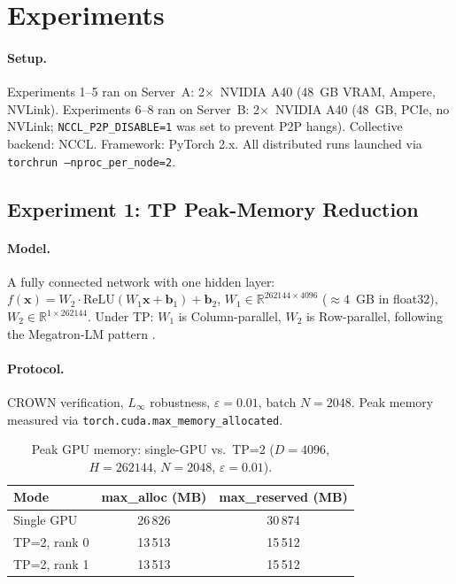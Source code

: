 \documentclass[11pt]{article}
\begin{document}
\section{Experiments}
\label{sec:experiments}

\paragraph{Setup.}
Experiments 1--5 ran on Server~A: 2$\times$~NVIDIA A40 (48~GB VRAM, Ampere,
NVLink). Experiments 6--8 ran on Server~B: 2$\times$~NVIDIA A40 (48~GB,
PCIe, no NVLink; \texttt{NCCL\_P2P\_DISABLE=1} was set to prevent P2P hangs).
Collective backend: NCCL. Framework: PyTorch 2.x.
All distributed runs launched via \texttt{torchrun --nproc\_per\_node=2}.

\subsection{Experiment 1: TP Peak-Memory Reduction}
\label{sec:exp1}

\paragraph{Model.}
A fully connected network with one hidden layer:
$f(\mathbf{x}) = W_2 \cdot \mathrm{ReLU}(W_1\mathbf{x} + \mathbf{b}_1) + \mathbf{b}_2$,
$W_1 \in \mathbb{R}^{262144 \times 4096}$ (${\approx}4$~GB in float32),
$W_2 \in \mathbb{R}^{1 \times 262144}$.
Under TP: $W_1$ is Column-parallel, $W_2$ is Row-parallel, following the
Megatron-LM pattern \citep{MegatronLM2020}.

\paragraph{Protocol.}
CROWN verification, $L_\infty$ robustness, $\varepsilon{=}0.01$, batch
$N{=}2048$. Peak memory measured via
\texttt{torch.cuda.max\_memory\_allocated}.

\begin{table}[h]
\caption{Peak GPU memory: single-GPU vs.\ TP=2
($D{=}4096$, $H{=}262144$, $N{=}2048$, $\varepsilon{=}0.01$).}
\label{tab:tp-memory}
\vskip 0.1in
\begin{center}
\begin{tabular}{lcc}
\toprule
Mode & max\_alloc (MB) & max\_reserved (MB) \\
\midrule
Single GPU    & 26\,826 & 30\,874 \\
TP=2, rank 0  & 13\,513 & 15\,512 \\
TP=2, rank 1  & 13\,513 & 15\,512 \\
\bottomrule
\end{tabular}
\end{center}
\end{table}
\end{document}
